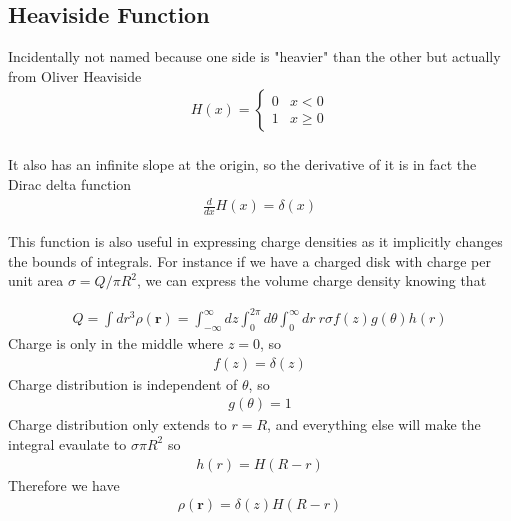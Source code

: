\subsection{Heaviside Function}
Incidentally not named because one side is "heavier" than the other but actually from Oliver Heaviside
\begin{align}
H(x) =
\begin{cases}
0 & x < 0\\
1 & x\ge 0
\end{cases}\\
\end{align}

It also has an infinite slope at the origin, so the derivative of it is in fact the Dirac delta function
\begin{align}
\frac{d}{dx} H(x) = \delta(x)
\end{align}


This function is also useful in expressing charge densities as it implicitly changes the bounds of integrals. For instance if we have a charged disk with charge per unit area $\sigma = Q/\pi R^2$, we can express the volume charge density knowing that

\begin{align}
Q = \int dr^3 \rho(\textbf{r}) = \int_{-\infty}^\infty dz \int_0^{2\pi} d\theta \int_0^\infty dr~r \sigma f(z)g(\theta)h(r)
\end{align}
Charge is only in the middle where $z=0$, so
\begin{align}
f(z) = \delta(z)
\end{align}
Charge distribution is independent of $\theta$, so
\begin{align}
g(\theta) = 1
\end{align}
Charge distribution only extends to $r=R$, and everything else will make the integral evaulate to $\sigma\pi R^2$ so
\begin{align}
h(r) = H(R-r)
\end{align}
Therefore we have
\begin{align}
\rho(\textbf{r}) = \delta(z)H(R-r)
\end{align}






